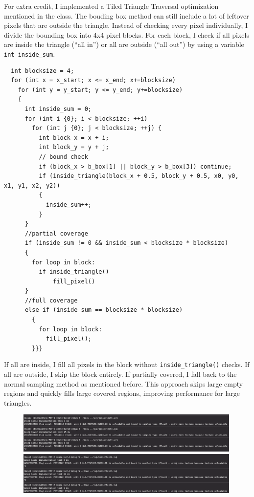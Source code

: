 \documentclass[11pt]{article}
\begin{document}
For extra credit, I implemented a Tiled Triangle Traversal optimization
mentioned in the class. The bouding box method can still include a lot of leftover
pixels that are outside the triangle. Instead of checking every pixel individually, I divide the bounding box into 4x4 pixel blocks.
For each block, I check if all pixels are inside the triangle (“all in”) or all are outside (“all out”)
by using a variable \texttt{int inside\_sum}.
\begin{verbatim}
  int blocksize = 4;
  for (int x = x_start; x <= x_end; x+=blocksize)
    for (int y = y_start; y <= y_end; y+=blocksize)
    {
      int inside_sum = 0;
      for (int i {0}; i < blocksize; ++i)
        for (int j {0}; j < blocksize; ++j) {
          int block_x = x + i;
          int block_y = y + j;
          // bound check
          if (block_x > b_box[1] || block_y > b_box[3]) continue;
          if (inside_triangle(block_x + 0.5, block_y + 0.5, x0, y0, x1, y1, x2, y2))
          {
            inside_sum++;
          }
      }
      //partial coverage
      if (inside_sum != 0 && inside_sum < blocksize * blocksize)
      {
        for loop in block: 
          if inside_triangle()
              fill_pixel()
      }
      //full coverage
      else if (inside_sum == blocksize * blocksize)
        {
          for loop in block:
            fill_pixel(); 
        }}}
\end{verbatim}
If all are inside, I fill all pixels in the block without \texttt{inside\_triangle()} checks.
If all are outside, I skip the block entirely.
If partially covered, I fall back to the normal sampling method as mentioned before.
This approach skips large empty regions and quickly fills large covered regions, improving performance for large triangles.
\begin{figure}[h]
    \centering
    \includegraphics[width=0.99\textwidth]{T14.png}
    \caption{}
    \includegraphics[width=0.99\textwidth]{T15.png}
    \caption{} %
\end{figure}
\end{document}
